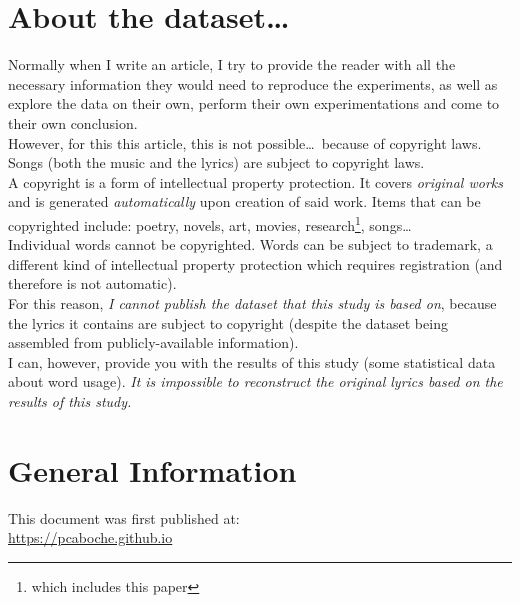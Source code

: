 \newpage

\section{About the dataset\dots}

Normally when I write an article, I try to provide the reader with all the necessary information they would need to reproduce the experiments, as well as explore the data on their own, perform their own experimentations and come to their own conclusion. \\

However, for this this article, this is not possible\dots\ because of copyright laws. \\

Songs (both the music and the lyrics) are subject to copyright laws. \\



A copyright is a form of intellectual property protection. It covers \emph{original works} and is generated \emph{automatically} upon creation of said work.
Items that can be copyrighted include: poetry, novels, art, movies, research\footnote{which includes this paper}, songs\dots\ \\

Individual words cannot be copyrighted. Words can be subject to trademark, a different kind of intellectual property protection which requires registration (and therefore is not automatic). \\


For this reason, \emph{I cannot publish the dataset that this study is based on}, because the lyrics it contains are subject to copyright (despite the dataset being assembled from publicly-available information). \\

I can, however, provide you with the results of this study (some statistical data about word usage). \emph{It is impossible to reconstruct the original lyrics based on the results of this study.}

\bigskip
\bigskip




\newpage
\section{General Information}

This document was first published at: \\
\mbox{} \hfill \url{https://pcaboche.github.io} 

